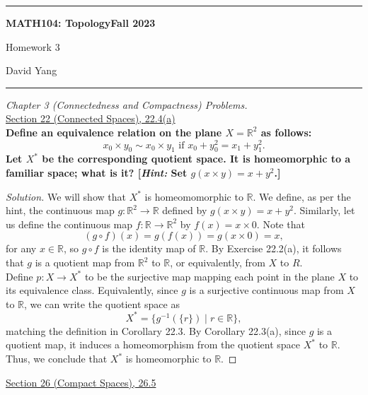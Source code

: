 \documentclass[11pt]{article}
\newcommand{\R}{\mathbb{R}}
\newenvironment{solution}
  {\renewcommand\qedsymbol{$\blacksquare$}\begin{proof}[Solution]}
  {\end{proof}}
\begin{document}
	\hrule
	\begin{center}
        \textbf{MATH104: Topology}\hfill \textbf{Fall 2023}\newline

		{\Large Homework 3}

		David Yang
	\end{center}

\hrule

\vspace{1em}

\textit{Chapter 3 (Connectedness and Compactness) Problems.} \\

\underline{Section 22 (Connected Spaces), 22.4(a)} \\

\textbf{Define an equivalence relation on the plane $X = \R^2$ as follows:}
\[
	x_0 \times y_0 \sim x_0 \times y_1 \text{ if } x_0 + y_0^2 = x_1 + y_1^2.
\]
\textbf{Let $X^*$ be the corresponding quotient space. It is homeomorphic to a familiar space; what is it?
[\textit{Hint:} Set $g(x \times y) = x + y^2$.]} \\

\begin{solution}
We will show that $X^*$ is homeomomorphic to $\R$. We define, as per the hint, the continuous map $g\colon \R^2 \rightarrow \R$ defined by
$g(x \times y) = x + y^2$. Similarly, let us define the continuous map $f \colon \R \rightarrow \R^2$ by $f(x) = x \times 0$. Note that
\[
	(g \circ f)(x) = g(f(x)) = g(x \times 0) = x,
\]
for any $x \in \R$, so $g \circ f$ is the identity map of $\R$. By Exercise 22.2(a), it follows that $g$ is a quotient map from $\R^2$ to $\R$,
or equivalently, from $X$ to $R$. \\

Define $p \colon X \rightarrow X^*$ to be the surjective map mapping each point in the plane $X$ to its equivalence class. Equivalently,
since $g$ is a surjective continuous map from $X$ to $\R$, we can write the quotient space as
\[
	X^* = \{ g^{-1}(\{ r \}) \mid r \in \R\},
\]
matching the definition in Corollary 22.3. By Corollary 22.3(a), since $g$ is a quotient map, 
it induces a homeomorphism from the quotient space $X^*$ to $\R$. \\

Thus, we conclude that $X^*$ is homeomorphic to $\R$.
\end{solution}

\newpage

\underline{Section 26 (Compact Spaces), 26.5} \\
\end{document}

